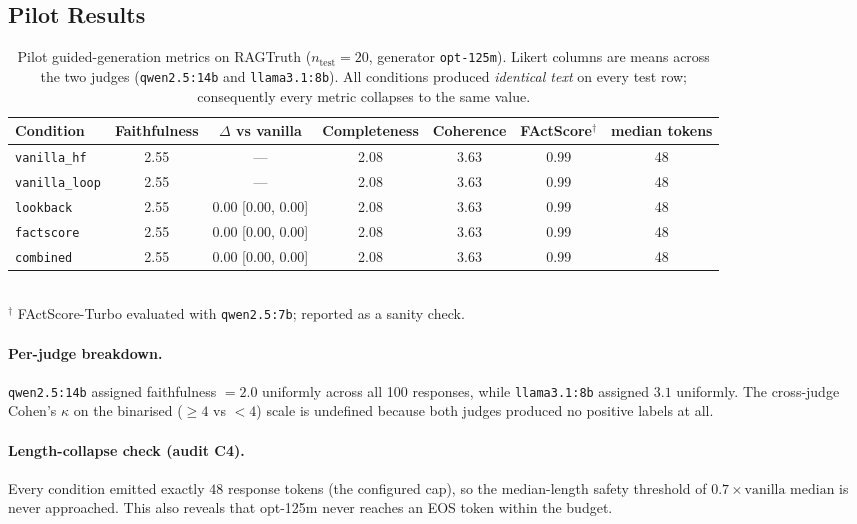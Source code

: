 \subsection{Pilot Results}

\begin{table}[h]
  \centering
  \caption{Pilot guided-generation metrics on RAGTruth ($n_{\text{test}}=20$,
  generator \texttt{opt-125m}).  Likert columns are means across the two
  judges (\texttt{qwen2.5:14b} and \texttt{llama3.1:8b}).  All conditions
  produced \emph{identical text} on every test row; consequently every
  metric collapses to the same value.}
  \label{tab:guided_pilot_results}
  \begin{tabular}{lcccccc}
    \toprule
    Condition       & Faithfulness & $\Delta$ vs vanilla & Completeness & Coherence
                    & FActScore$^{\dagger}$ & median tokens \\
    \midrule
    \texttt{vanilla\_hf}    & 2.55 & ---     & 2.08 & 3.63 & 0.99 & 48 \\
    \texttt{vanilla\_loop}  & 2.55 & ---     & 2.08 & 3.63 & 0.99 & 48 \\
    \texttt{lookback}       & 2.55 & 0.00 [0.00, 0.00] & 2.08 & 3.63 & 0.99 & 48 \\
    \texttt{factscore}      & 2.55 & 0.00 [0.00, 0.00] & 2.08 & 3.63 & 0.99 & 48 \\
    \texttt{combined}       & 2.55 & 0.00 [0.00, 0.00] & 2.08 & 3.63 & 0.99 & 48 \\
    \bottomrule
  \end{tabular}\\[2pt]
  \footnotesize{$^{\dagger}$ FActScore-Turbo evaluated with \texttt{qwen2.5:7b}; reported as a sanity check.}
\end{table}

\paragraph{Per-judge breakdown.} \texttt{qwen2.5:14b} assigned faithfulness
$=2.0$ uniformly across all 100 responses, while \texttt{llama3.1:8b}
assigned $3.1$ uniformly.  The cross-judge Cohen's $\kappa$ on the binarised
($\geq 4$ vs $<4$) scale is undefined because both judges produced no
positive labels at all.

\paragraph{Length-collapse check (audit C4).} Every condition emitted exactly
$48$ response tokens (the configured cap), so the median-length safety
threshold of $0.7\times \text{vanilla median}$ is never approached.  This
also reveals that opt-125m never reaches an EOS token within the budget.

